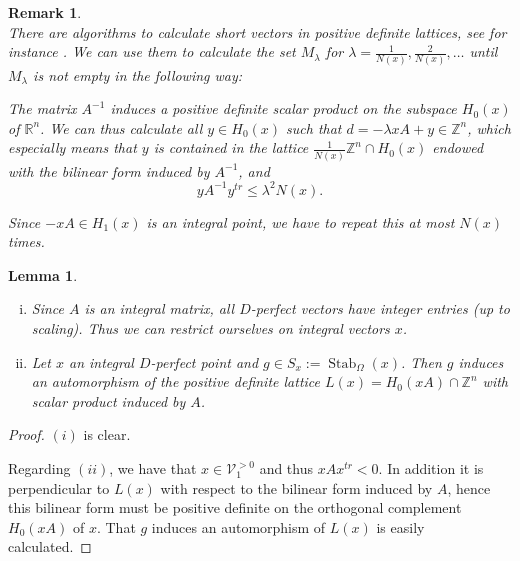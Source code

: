 \documentclass[10pt, preprint]{elsarticle}
\newtheorem{lemma}[theorem]{Lemma}
\newtheorem{remark}[theorem]{Remark}
\theoremstyle{definition}
\theoremstyle{definition}
\newcommand{\Z}{\mathbb{Z}}
\newcommand{\R}{\mathbb{R}}
\newcommand{\V}{\mathcal{V}}
\newcommand{\Stab}{\operatorname{Stab}}
\newcommand{\Vgt}{\V_1^{>0}}
\begin{document}
\begin{remark}\mbox{}\\
There are algorithms to calculate short vectors in positive definite lattices, see for instance \cite[pp. 188-190]{PoZ}. We can use them to calculate the set $M_\lambda$ for $\lambda=\tfrac{1}{N(x)},\tfrac{2}{N(x)},\dots$ until $M_\lambda$ is not empty in the following way: 

The matrix $A^{-1}$ induces a positive definite scalar product on the subspace $H_0(x)$ of $\R^n$. We can thus calculate all $y\in H_0(x)$ such that $d=-\lambda xA +y\in\Z^n$, which especially means that $y$ is contained in the lattice $\tfrac{1}{N(x)}\Z^n\cap H_0(x)$ endowed with the bilinear form induced by $A^{-1}$, and 
\[yA^{-1}y^{tr}\leq \lambda^2N(x).\]

Since $-xA\in H_1(x)$ is an integral point, we have to repeat this at most $N(x)$ times.
\end{remark}
\begin{lemma}\label{lemStab}\mbox{}
\begin{enumerate}[(i)]
\item Since $A$ is an integral matrix, all $D$-perfect vectors have integer entries (up to scaling). Thus we can restrict ourselves on integral vectors $x$.
\item Let $x$ an integral $D$-perfect point and $g\in S_x:=\Stab_\Omega(x)$. Then $g$ induces an automorphism of the positive definite lattice $L(x)=H_0(xA)\cap\Z^n$ with scalar product induced by $A$.
\end{enumerate}
\end{lemma}
\begin{proof}
$(i)$ is clear. 

Regarding $(ii)$, we have that $x\in\Vgt$ and thus $xAx^{tr}<0$. In addition it is perpendicular to $L(x)$ with respect to the bilinear form induced by $A$, hence this bilinear form must be positive definite on the orthogonal complement $H_0(xA)$ of $x$. That $g$ induces an automorphism of $L(x)$ is easily calculated.
\end{proof}
\end{document}
